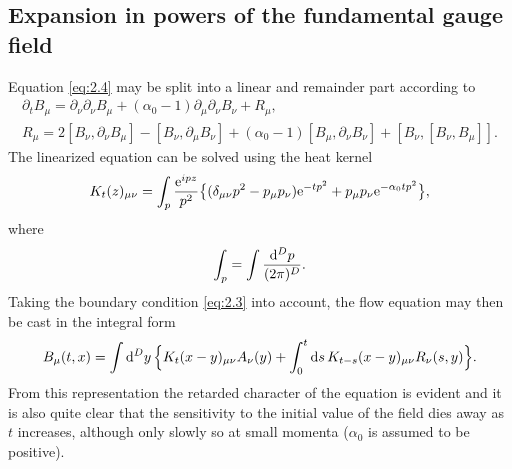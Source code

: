 \subsection{Expansion in powers of the fundamental gauge field}

Equation \eqref{eq:2.4} may be split into a linear and remainder part
according to
\begin{align}
  \partial_tB_{\mu}=\partial_{\nu}\partial_{\nu}B_{\mu}
  +(\alpha_0-1)\partial_{\mu}\partial_{\nu}B_{\nu}+R_{\mu},
  \label{eq:2.6}\\[2pt]
  R_{\mu}=2[B_{\nu},\partial_{\nu}B_{\mu}]-
  [B_{\nu},\partial_{\mu}B_{\nu}]+(\alpha_0-1)[B_{\mu},\partial_{\nu}B_{\nu}]
  +[B_{\nu},[B_{\nu},B_{\mu}]].
  \label{eq:2.7}
\end{align}
The linearized equation can be solved using the heat kernel
\begin{equation}
  K_t(z)_{\mu\nu}=
  \int_p{\mathrm{e}^{ipz}\over p^2}\bigl\{
  (\delta_{\mu\nu}p^2-p_{\mu}p_{\nu})\mathrm{e}^{-tp^2}+
  p_{\mu}p_{\nu}\mathrm{e}^{-\alpha_0tp^2}\bigr\},
  \label{eq:2.8}
\end{equation}
where
\begin{equation}
  \int_p=\int{\mathrm{d}^Dp\over(2\pi)^D}.
  \label{eq:2.9}
\end{equation}
Taking the boundary condition \eqref{eq:2.3} into account, the flow equation
may then be cast in the integral form
\begin{equation}
  B_{\mu}(t,x)=\int\mathrm{d}^Dy\,\Bigl\{
  K_t(x-y)_{\mu\nu}A_{\nu}(y)
  +\int_0^t\mathrm{d} s\,K_{t-s}(x-y)_{\mu\nu}R_{\nu}(s,y)\Bigr\}.
  \label{eq:2.10}
\end{equation}
From this representation the retarded character of the equation
is evident and it is also quite
clear that the sensitivity to the initial value of the field dies away as
$t$ increases, although only slowly so at small momenta
($\alpha_0$ is assumed to be positive).

